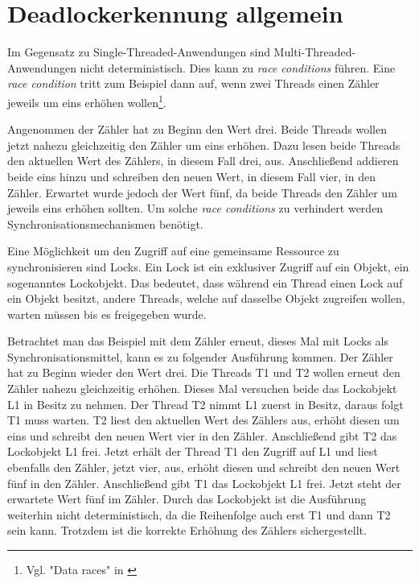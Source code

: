 \section{Deadlockerkennung allgemein}
\label{section:Deadlockerkennung allgemein}
Im Gegensatz zu Single-Threaded-Anwendungen sind Multi-Threaded-Anwendungen
nicht deterministisch. Dies kann zu \emph{race conditions} führen. Eine
\emph{race condition} tritt zum Beispiel dann auf, wenn zwei Threads einen
Zähler jeweils um eins erhöhen wollen\footnote{Vgl. "Data races" in
\autocite[70]{netzer1992race}}.

Angenommen der Zähler hat zu Beginn den Wert drei. Beide Threads wollen jetzt
nahezu gleichzeitig den Zähler um eins erhöhen. Dazu lesen beide Threads den
aktuellen Wert des Zählers, in diesem Fall drei, aus. Anschließend addieren
beide eins hinzu und schreiben den neuen Wert, in diesem Fall vier, in den
Zähler. Erwartet wurde jedoch der Wert fünf, da beide Threads den Zähler um
jeweils eins erhöhen sollten. Um solche \emph{race conditions} zu verhindert
werden Synchronisationsmechanismen benötigt.

Eine Möglichkeit um den Zugriff auf eine gemeinsame Ressource zu synchronisieren
sind Locks. Ein Lock ist ein exklusiver Zugriff auf ein Objekt, ein sogenanntes
Lockobjekt. Das bedeutet, dass während ein Thread einen Lock auf ein Objekt
besitzt, andere Threads, welche auf dasselbe Objekt zugreifen wollen, warten
müssen bis es freigegeben wurde.

Betrachtet man das Beispiel mit dem Zähler erneut, dieses Mal mit Locks als
Synchronisationsmittel, kann es zu folgender Ausführung kommen. Der Zähler hat
zu Beginn wieder den Wert drei. Die Threads \textrm{T1} und \textrm{T2} wollen
erneut den Zähler nahezu gleichzeitig erhöhen. Dieses Mal versuchen beide das
Lockobjekt \textrm{L1} in Besitz zu nehmen. Der Thread \textrm{T2} nimmt
\textrm{L1} zuerst in Besitz, daraus folgt \textrm{T1} muss warten. \textrm{T2}
liest den aktuellen Wert des Zählers aus, erhöht diesen um eins und schreibt den
neuen Wert vier in den Zähler. Anschließend gibt \textrm{T2} das Lockobjekt
\textrm{L1} frei. Jetzt erhält der Thread \textrm{T1} den Zugriff auf
\textrm{L1} und liest ebenfalls den Zähler, jetzt vier, aus, erhöht diesen und
schreibt den neuen Wert fünf in den Zähler. Anschließend gibt \textrm{T1} das
Lockobjekt \textrm{L1} frei. Jetzt steht der erwartete Wert fünf im Zähler.
Durch das Lockobjekt ist die Ausführung weiterhin nicht deterministisch, da die
Reihenfolge auch erst \textrm{T1} und dann \textrm{T2} sein kann. Trotzdem ist
die korrekte Erhöhung des Zählers sichergestellt.

